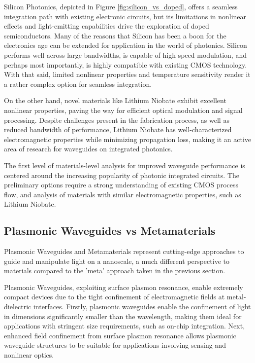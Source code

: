 \documentclass[10pt]{article}
\begin{document}
Silicon Photonics, depicted in Figure \ref{fig:silicon_vs_doped}, offers a seamless integration path with existing electronic circuits, but its limitations in nonlinear effects and light-emitting capabilities drive the exploration of doped semiconductors. Many of the 
reasons that Silicon has been a boon for the electronics age can be extended for application in the world of photonics. Silicon performs well across large bandwidths, is capable of high speed modulation, and perhaps most importantly, is highly compatible with existing CMOS technology.
With that said, limited nonlinear properties and temperature sensitivity render it a rather complex option for seamless integration.

On the other hand, novel materials like Lithium Niobate exhibit excellent nonlinear properties, paving the way for efficient optical modulation and signal processing. Despite 
challenges present in the fabrication process, as well as reduced bandwidth of performance, Lithium Niobate has well-characterized electromagnetic properties while minimizing propagation loss, 
making it an active area of research for waveguides on integrated photonics.


The first level of materials-level analysis for improved waveguide performance is centered around the increasing popularity of photonic integrated circuits. 
The preliminary options require a strong understanding of existing CMOS process flow, and analysis of materials with similar electromagnetic properties, such as Lithium Niobate.

\subsection{Plasmonic Waveguides vs Metamaterials}

Plasmonic Waveguides and Metamaterials represent cutting-edge approaches to guide and manipulate light on a nanoscale, a much different perspective to materials compared to the 'meta' approach taken in the previous section.

Plasmonic Waveguides, exploiting surface plasmon resonance, enable extremely compact devices due to the tight confinement of electromagnetic fields at metal-dielectric interfaces. 
Firstly, plasmonic waveguides enable the confinement of light in dimensions significantly smaller than the wavelength, making them ideal for applications with stringent size requirements, such as on-chip integration.
Next, enhanced field confinement from surface plasmon resonance allows plasmonic waveguide structures to be suitable for applications involving sensing and nonlinear optics.
\end{document}
